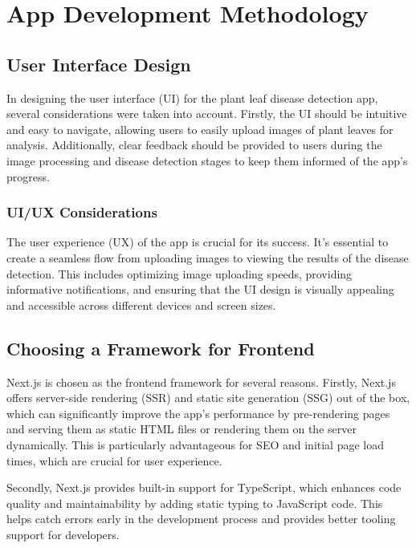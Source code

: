 \documentclass{article}
\begin{document}
\section{App Development Methodology}

\subsection{User Interface Design}

In designing the user interface (UI) for the plant leaf disease detection app, several considerations were taken into account. Firstly, the UI should be intuitive and easy to navigate, allowing users to easily upload images of plant leaves for analysis. Additionally, clear feedback should be provided to users during the image processing and disease detection stages to keep them informed of the app's progress.

\subsubsection{UI/UX Considerations}

The user experience (UX) of the app is crucial for its success. It's essential to create a seamless flow from uploading images to viewing the results of the disease detection. This includes optimizing image uploading speeds, providing informative notifications, and ensuring that the UI design is visually appealing and accessible across different devices and screen sizes.


\subsection{Choosing a Framework for Frontend}

Next.js is chosen as the frontend framework for several reasons. Firstly, Next.js offers server-side rendering (SSR) and static site generation (SSG) out of the box, which can significantly improve the app's performance by pre-rendering pages and serving them as static HTML files or rendering them on the server dynamically. This is particularly advantageous for SEO and initial page load times, which are crucial for user experience.

Secondly, Next.js provides built-in support for TypeScript, which enhances code quality and maintainability by adding static typing to JavaScript code. This helps catch errors early in the development process and provides better tooling support for developers.
\end{document}
